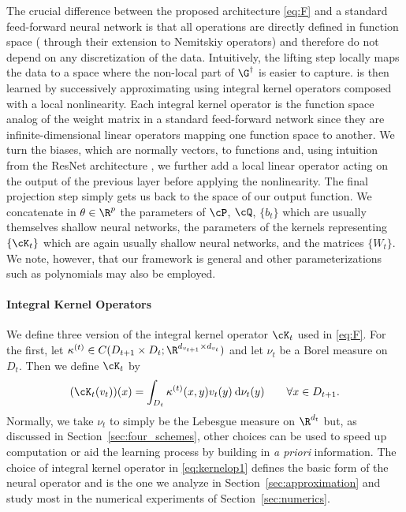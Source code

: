 The crucial difference between the proposed architecture \eqref{eq:F} and a standard feed-forward neural network is that all operations are directly defined in function space ( through their extension to Nemitskiy operators) and therefore do not depend on any discretization of the data. Intuitively, the lifting step locally maps the data to a space where the non-local part of \(\G^\dagger\) is easier to capture.   is then learned by successively approximating using integral kernel operators composed with a local nonlinearity. Each 
integral kernel operator is the function space analog of the weight matrix in a standard feed-forward network since they are infinite-dimensional linear operators mapping one function space to another. We turn the biases, which are normally vectors, to functions and, using intuition from the ResNet architecture \citep{he2016deep}, we further add a local linear operator acting on the output of the previous layer before applying the nonlinearity. The final projection step simply gets us back to the space of our output function. We concatenate in \(\theta \in \R^p\) the parameters of \(\cP\), \(\cQ\), \(\{b_t\}\) which are usually themselves shallow neural networks, the parameters of the kernels representing \(\{\cK_t\}\) which are again usually shallow neural networks, and the matrices \(\{W_t\}\). We note, however, that our framework is general and other parameterizations such as polynomials may also be employed. 

\paragraph{Integral Kernel Operators} We define three version of the integral kernel operator \(\cK_t\) used in \eqref{eq:F}. For the first, let \(\kappa^{(t)} \in C(D_{t+1} \times D_t; \R^{d_{v_{t+1}} \times d_{v_t}})\) and let \(\nu_t\) be a Borel measure on \(D_t\). Then we define \(\cK_t\) by
\begin{equation}
    \label{eq:kernelop1}
    (\cK_t(v_t))(x) = \int_{D_t} \kappa^{(t)} (x,y) v_t(y) \: \text{d}\nu_t(y)
    \qquad \forall x \in D_{t+1}.
\end{equation}
Normally, we take \(\nu_t\) to simply be the Lebesgue measure on \(\R^{d_t}\) but, as discussed in Section~\ref{sec:four_schemes}, other choices can be used to speed up computation or aid the learning process by building in \textit{a priori} information. The choice of integral kernel operator in \eqref{eq:kernelop1} defines the basic form of the neural operator and is the one we analyze in Section~\ref{sec:approximation} and study most in the numerical experiments of Section~\ref{sec:numerics}.


